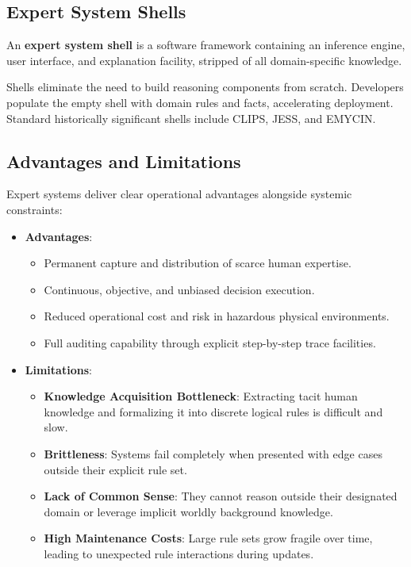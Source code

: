\documentclass[12pt]{report}
\begin{document}
\subsection{Expert System Shells}

An \textbf{expert system shell} is a software framework containing an inference engine, user interface, and explanation facility, stripped of all domain-specific knowledge. 

Shells eliminate the need to build reasoning components from scratch. Developers populate the empty shell with domain rules and facts, accelerating deployment. Standard historically significant shells include CLIPS, JESS, and EMYCIN.

\subsection{Advantages and Limitations}

Expert systems deliver clear operational advantages alongside systemic constraints:

\begin{itemize}
    \item \textbf{Advantages}:
    \begin{itemize}
        \item Permanent capture and distribution of scarce human expertise.
        \item Continuous, objective, and unbiased decision execution.
        \item Reduced operational cost and risk in hazardous physical environments.
        \item Full auditing capability through explicit step-by-step trace facilities.
    \end{itemize}
    \item \textbf{Limitations}:
    \begin{itemize}
        \item \textbf{Knowledge Acquisition Bottleneck}: Extracting tacit human knowledge and formalizing it into discrete logical rules is difficult and slow.
        \item \textbf{Brittleness}: Systems fail completely when presented with edge cases outside their explicit rule set.
        \item \textbf{Lack of Common Sense}: They cannot reason outside their designated domain or leverage implicit worldly background knowledge.
        \item \textbf{High Maintenance Costs}: Large rule sets grow fragile over time, leading to unexpected rule interactions during updates.
    \end{itemize}
\end{itemize}
\end{document}
